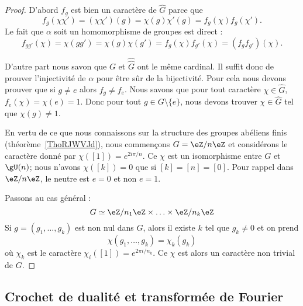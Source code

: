 \begin{proof}

	D'abord \( f_g\) est bien un caractère de \( \hat G\) parce que
	\begin{equation}
		f_g(\chi\chi')=(\chi\chi')(g)=\chi(g)\chi'(g)=f_g(\chi)f_g(\chi').
	\end{equation}
	Le fait que \( \alpha\) soit un homomorphisme de groupes est direct :
	\begin{equation}
		f_{gg'}(\chi)=\chi(gg')=\chi(g)\chi(g')=f_g(\chi)f_{g'}(\chi)=(f_gf_{g'})(\chi).
	\end{equation}

	D'autre part nous savon que \( G\) et \( \hat{\hat G}\) ont le même cardinal. Il suffit donc de prouver l'injectivité de \( \alpha\) pour être sûr de la bijectivité. Pour cela nous devons prouver que si \( g\neq e\) alors \( f_g\neq f_e\). Nous savons que pour tout caractère \( \chi\in \hat G\), \( f_e(\chi)=\chi(e)=1\). Donc pour tout \( g\in G\setminus\{ e \}\), nous devons trouver \( \chi\in \hat G\) tel que \( \chi(g)\neq 1\).

	En vertu de ce que nous connaissons sur la structure des groupes abéliens finis (théorème~\ref{ThoRJWVJd}), nous commençons \( G=\eZ/n\eZ\) et considérons le caractère donné par \( \chi([1])= e^{2i\pi/n}\). Ce \( \chi\) est un isomorphisme entre \( G\) et \( \gU(n)\); nous n'avons \( \chi([k])=0\) que si \( [k]=[n]=[0]\). Pour rappel dans \( \eZ/n\eZ\), le neutre est \( e=0\) et non \( e=1\).

	Passons au cas général :
	\begin{equation}
		G\simeq \eZ/n_1\eZ\times \ldots\times \eZ/n_k\eZ
	\end{equation}
	Si \( g=(g_1,\ldots, g_k)\) est non nul dans \( G\), alors il existe \( k\) tel que \( g_k\neq 0\) et on prend
	\begin{equation}
		\chi(g_1,\ldots, g_k)=\chi_k(g_k)
	\end{equation}
	où \( \chi_k\) est le caractère \( \chi_i([1])= e^{2\pi i/n_k}\). Ce \( \chi\) est alors un caractère non trivial de \( G\).

\end{proof}

\subsection{Crochet de dualité et transformée de Fourier}

